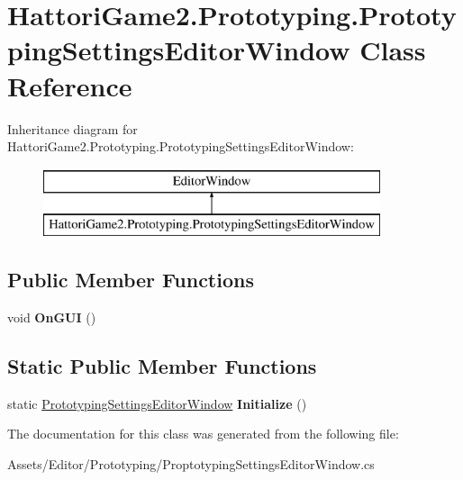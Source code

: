 \hypertarget{class_hattori_game2_1_1_prototyping_1_1_prototyping_settings_editor_window}{}\section{Hattori\+Game2.\+Prototyping.\+Prototyping\+Settings\+Editor\+Window Class Reference}
\label{class_hattori_game2_1_1_prototyping_1_1_prototyping_settings_editor_window}
Inheritance diagram for Hattori\+Game2.\+Prototyping.\+Prototyping\+Settings\+Editor\+Window\+:\begin{figure}[H]
\begin{center}
\leavevmode
\includegraphics[height=2.000000cm]{class_hattori_game2_1_1_prototyping_1_1_prototyping_settings_editor_window}
\end{center}
\end{figure}
\subsection*{Public Member Functions}
\begin{DoxyCompactItemize}
\item 
\hypertarget{class_hattori_game2_1_1_prototyping_1_1_prototyping_settings_editor_window_aa22efe3bd7d23550d458e5a636747929}{}void {\bfseries On\+G\+U\+I} ()\label{class_hattori_game2_1_1_prototyping_1_1_prototyping_settings_editor_window_aa22efe3bd7d23550d458e5a636747929}

\end{DoxyCompactItemize}
\subsection*{Static Public Member Functions}
\begin{DoxyCompactItemize}
\item 
\hypertarget{class_hattori_game2_1_1_prototyping_1_1_prototyping_settings_editor_window_a65c3ea7e5bd11f40ef25d73314d940d6}{}static \hyperlink{class_hattori_game2_1_1_prototyping_1_1_prototyping_settings_editor_window}{Prototyping\+Settings\+Editor\+Window} {\bfseries Initialize} ()\label{class_hattori_game2_1_1_prototyping_1_1_prototyping_settings_editor_window_a65c3ea7e5bd11f40ef25d73314d940d6}

\end{DoxyCompactItemize}


The documentation for this class was generated from the following file\+:\begin{DoxyCompactItemize}
\item 
Assets/\+Editor/\+Prototyping/Proptotyping\+Settings\+Editor\+Window.\+cs\end{DoxyCompactItemize}
